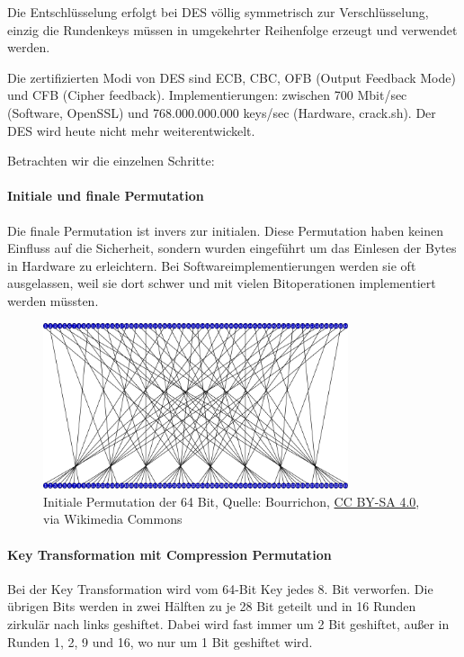 Die Entschlüsselung erfolgt bei DES völlig symmetrisch zur Verschlüsselung, einzig die Rundenkeys müssen in umgekehrter Reihenfolge erzeugt und verwendet werden.

Die zertifizierten Modi von DES sind ECB, CBC, OFB (Output Feedback Mode) und CFB (Cipher feedback). Implementierungen: zwischen 700 Mbit/sec (Software, OpenSSL) und 
768.000.000.000 keys/sec (Hardware, crack.sh). Der DES wird heute nicht mehr weiterentwickelt.

Betrachten wir die einzelnen Schritte:

\paragraph{Initiale und finale Permutation}

Die finale Permutation ist invers zur initialen.
Diese Permutation haben keinen Einfluss auf die Sicherheit, sondern wurden eingeführt um das Einlesen der Bytes in Hardware zu erleichtern. Bei Softwareimplementierungen 
werden sie oft ausgelassen, weil sie dort schwer und mit vielen Bitoperationen implementiert werden müssten.

\begin{figure}[h]
    \includegraphics[width=0.8\textwidth]{figures/fig4-Permutation_initiale.png}
    \centering
    \caption{Initiale Permutation der 64 Bit, Quelle: Bourrichon, \href{https://creativecommons.org/licenses/by-sa/4.0}{CC BY-SA 4.0}, via Wikimedia Commons}
\end{figure}

\paragraph{Key Transformation mit Compression Permutation}

Bei der Key Transformation wird vom 64-Bit Key jedes 8. Bit verworfen. Die übrigen Bits werden in zwei Hälften zu je 28 Bit geteilt und in 16 Runden zirkulär nach links 
geshiftet. Dabei wird fast immer um 2 Bit geshiftet, außer in Runden 1, 2, 9 und 16, wo nur um 1 Bit geshiftet wird.

